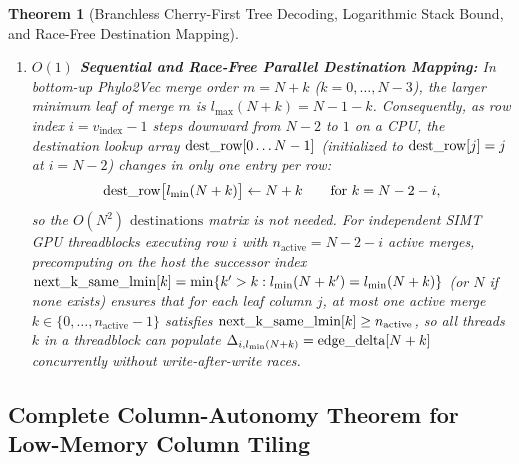 \documentclass[11pt,a4paper]{article}
\makeatletter
\DeclareRobustCommand{\_}{\ifmmode\nfss@text{\textunderscore}\else\textunderscore\allowbreak\fi}
\newtheorem{theorem}{Theorem}[section]
\theoremstyle{definition}
\makeatother
\begin{document}
\begin{theorem}[Branchless Cherry-First Tree Decoding, Logarithmic Stack Bound, and Race-Free Destination Mapping]
\begin{enumerate}
    \item \textbf{$O(1)$ Sequential and Race-Free Parallel Destination Mapping:} In bottom-up Phylo2Vec merge order $m = N + k$ ($k = 0, \dots, N-3$), the larger minimum leaf of merge $m$ is $l_{\max}(N+k) = N - 1 - k$. Consequently, as row index $i = v_{\text{index}} - 1$ steps downward from $N-2$ to $1$ on a CPU, the destination lookup array $\text{dest\_row}[0 \dots N-1]$ (initialized to $\text{dest\_row}[j] = j$ at $i = N-2$) changes in only one entry per row:
    \begin{equation}
    \text{dest\_row}\big[l_{\min}(N + k)\big] \leftarrow N + k \qquad \text{for } k = N - 2 - i,
    \end{equation}
    so the $O(N^2)$ $\text{destinations}$ matrix is not needed. For independent SIMT GPU threadblocks executing row $i$ with $n_{\text{active}} = N - 2 - i$ active merges, precomputing on the host the successor index $\text{next\_k\_same\_lmin}[k] = \min\{k' > k : l_{\min}(N+k') = l_{\min}(N+k)\}$ (or $N$ if none exists) ensures that for each leaf column $j$, at most one active merge $k \in \{0, \dots, n_{\text{active}}-1\}$ satisfies $\text{next\_k\_same\_lmin}[k] \ge n_{\text{active}}$, so all threads $k$ in a threadblock can populate $\Delta_{i, l_{\min}(N+k)} = \text{edge\_delta}[N+k]$ concurrently without write-after-write races.
\end{enumerate}
\end{theorem}

\subsection{Complete Column-Autonomy Theorem for Low-Memory Column Tiling}
\end{document}

